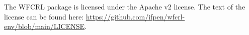 \documentclass{article}
\begin{document}
The WFCRL package is licensed under the Apache v2 license. The text of the license can be found here: \url{https://github.com/ifpen/wfcrl-env/blob/main/LICENSE}.












\end{document}
